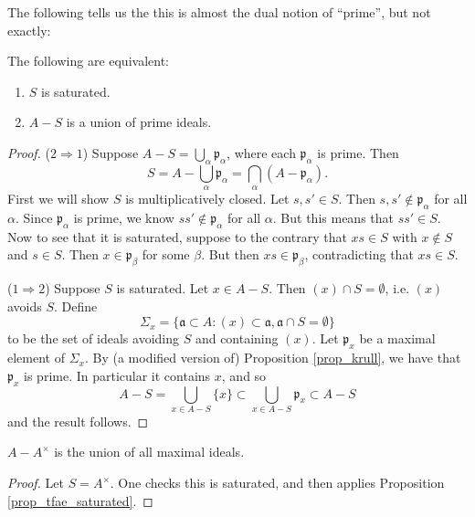 \documentclass[12pt]{article}
\begin{document}
The following tells us the this is almost the dual notion of ``prime'', but not exactly:

\begin{proposition}
\label{prop_tfae_saturated}
	The following are equivalent:
	\begin{enumerate}
		\item $S$ is saturated.
		\item $A-S$ is a union of prime ideals.
	\end{enumerate}
\end{proposition}
\begin{proof}
	($2\Rightarrow 1$) Suppose $A-S=\bigcup_\alpha \mathfrak{p}_\alpha$, where each $\mathfrak{p}_\alpha$ is prime. Then 
	\begin{equation*}
		S = A - \bigcup_\alpha \mathfrak{p}_\alpha = \bigcap_\alpha (A-\mathfrak{p}_\alpha).
	\end{equation*}
	First we will show $S$ is multiplicatively closed. Let $s,s'\in S$. Then $s,s'\not\in\mathfrak{p}_\alpha$ for all $\alpha$. Since $\mathfrak{p}_\alpha$ is prime, we know $ss'\not\in\mathfrak{p}_\alpha$ for all $\alpha$. But this means that $ss'\in S$. Now to see that it is saturated, suppose to the contrary that $xs\in S$ with $x\not\in S$ and $s\in S$. Then $x\in\mathfrak{p}_\beta$ for some $\beta$. But then $xs\in\mathfrak{p}_\beta$, contradicting that $xs\in S$. 

	($1\Rightarrow 2$) Suppose $S$ is saturated. Let $x\in A-S$. Then $(x)\cap S=\emptyset$, i.e. $(x)$ avoids $S$. Define
	\begin{equation*}
		\Sigma_x = \{\mathfrak{a}\subset A : (x) \subset \mathfrak{a}, \mathfrak{a}\cap S=\emptyset \}
	\end{equation*}
	to be the set of ideals avoiding $S$ and containing $(x)$. Let $\mathfrak{p}_x$ be a maximal element of $\Sigma_x$. By (a modified version of) Proposition \ref{prop_krull}, we have that $\mathfrak{p}_x$ is prime. In particular it contains $x$, and so 
	\begin{equation*}
		A-S = \bigcup_{x\in A-S}\{x\} \subset \bigcup_{x\in A-S}\mathfrak{p}_x \subset A-S
	\end{equation*}
	and the result follows.
\end{proof}

\begin{corollary}
	$A-A^\times$ is the union of all maximal ideals.
\end{corollary}
\begin{proof}
	Let $S=A^\times$. One checks this is saturated, and then applies Proposition \ref{prop_tfae_saturated}. 
\end{proof}
\end{document}
